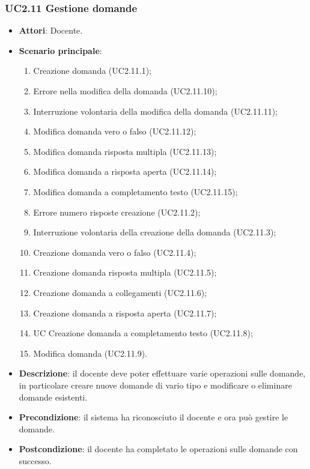 \subsubsection{UC2.11 Gestione domande}
\begin{itemize}
\item \textbf{Attori}: Docente.
\item \textbf{Scenario principale}:
\begin{enumerate}
\item Creazione domanda (UC2.11.1);
\item Errore nella modifica della domanda (UC2.11.10);
\item Interruzione volontaria della modifica della domanda (UC2.11.11);
\item Modifica domanda vero o falso (UC2.11.12);
\item Modifica domanda risposta multipla (UC2.11.13);
\item Modifica domanda a risposta aperta (UC2.11.14);
\item Modifica domanda a completamento testo (UC2.11.15);
\item Errore numero risposte creazione (UC2.11.2);
\item Interruzione volontaria della creazione della domanda (UC2.11.3);
\item Creazione domanda vero o falso (UC2.11.4);
\item Creazione domanda risposta multipla (UC2.11.5);
\item Creazione domanda a collegamenti (UC2.11.6);
\item Creazione domanda a risposta aperta (UC2.11.7);
\item UC Creazione domanda a completamento testo (UC2.11.8);
\item Modifica domanda (UC2.11.9).
\end{enumerate}
\item \textbf{Descrizione}: il docente deve poter effettuare varie operazioni sulle domande, in particolare creare nuove domande di vario tipo e modificare o eliminare domande esistenti.
\item \textbf{Precondizione}: il sistema ha riconosciuto il docente e ora può gestire le domande.
\item \textbf{Postcondizione}: il docente ha completato le operazioni sulle domande con successo.
\end{itemize}
